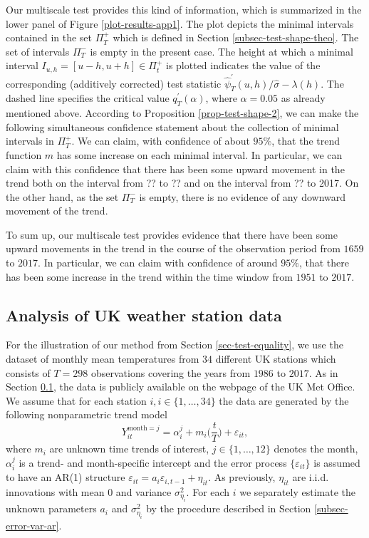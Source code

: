 Our multiscale test provides this kind of information, which is summarized in the lower panel of Figure \ref{plot-results-app1}. The plot depicts the minimal intervals contained in the set $\Pi_T^+$ which is defined in Section \ref{subsec-test-shape-theo}. The set of intervals $\Pi_T^-$ is empty in the present case. The height at which a minimal interval $I_{u,h} = [u-h,u+h] \in \Pi_t^+$ is plotted indicates the value of the corresponding (additively corrected) test statistic $\widehat{\psi}^\prime_T(u,h) / \hat{\sigma} - \lambda(h)$. The dashed line specifies the critical value $q_T^\prime(\alpha)$, where $\alpha = 0.05$ as already mentioned above. According to Proposition \ref{prop-test-shape-2}, we can make the following simultaneous confidence statement about the collection of minimal intervals in $\Pi_T^+$. We can claim, with confidence of about $95\%$, that the trend function $m$ has some increase on each minimal interval. In particular, we can claim with this confidence that there has been some upward movement in the trend both on the interval from ?? to ?? and on the interval from ?? to 2017. 
On the other hand, as the set $\Pi_T^-$ is empty, there is no evidence of any downward movement of the trend.  


To sum up, our multiscale test provides evidence that there have been some upward movements in the trend in the course of the observation period from $1659$ to $2017$. In particular, we can claim with confidence of around $95\%$, that there has been some increase in the trend within the time window from $1951$ to $2017$. 




\subsection{Analysis of UK weather station data}\label{subsec-data-2} 

For the illustration of our method from Section \ref{sec-test-equality}, we use the dataset of monthly mean temperatures from $34$ different UK stations which consists of $T=298$ observations covering the years from $1986$ to $2017$. As in Section \ref{subsec-data-2}, the data is publicly available on the webpage of the UK Met Office. We assume that for each station $i, i \in \{1,\ldots, 34\}$ the data are generated by the following nonparametric trend model 
\[ Y_{it}^{\text{month} = j} = \alpha_i^j + m_i\Big(\frac{t}{T}\Big) + \varepsilon_{it}, \]
where $m_i$ are unknown time trends of interest, $j \in \{1, \ldots, 12\}$ denotes the month, $\alpha_i^j$ is a trend- and month-specific intercept and the error process $\{ \varepsilon_{it} \}$ is assumed to have an AR(1) structure $\varepsilon_{it} = a_i \varepsilon_{i,t-1} + \eta_{it}$. As previously, $\eta_{it}$ are i.i.d. innovations with mean $0$ and variance $\sigma_{\eta_i}^2$. For each $i$ we separately estimate the unknown parameters $a_i$ and $\sigma_{\eta_i}^2$  by the procedure described in Section \ref{subsec-error-var-ar}.



